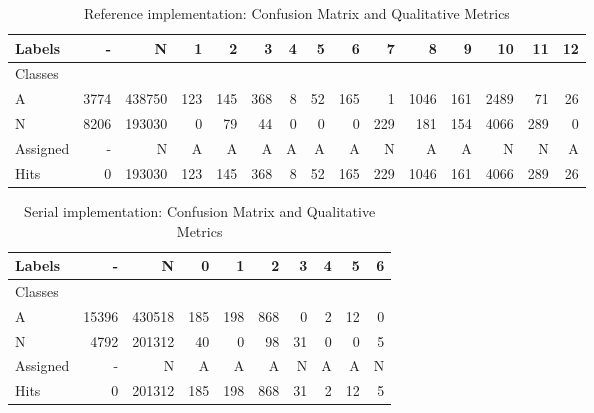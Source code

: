 \documentclass[conference]{IEEEtran}
\begin{document}
\begin{table}[htb]
  \begin{center}
    \caption{Reference implementation: Confusion Matrix and Qualitative Metrics}
    \begin{tabular}{l||r|r|r|r|r|r|r|r|r|r|r|r|r|r}
      
      Labels &     - &       N &    1 &    2 &    3 &  4 &   5 &    6 &    7 &     8 &    9 &    10 &   11 &  12 \\\hline
      Classes  &       &         &      &      &      &    &     &      &      &       &      &       &      &     \\\hline
      \hline
      A        &  3774 &  438750 &  123 &  145 &  368 &  8 &  52 &  165 &    1 &  1046 &  161 &  2489 &   71 &  26 \\\hline
      N        &  8206 &  193030 &    0 &   79 &   44 &  0 &   0 &    0 &  229 &   181 &  154 &  4066 &  289 &   0 \\\hline
      \hline
      Assigned &     - &       N &    A &    A &    A &  A &   A &    A &    N &     A &    A &     N &    N &   A \\\hline
      Hits     &     0 &  193030 &  123 &  145 &  368 &  8 &  52 &  165 &  229 &  1046 &  161 &  4066 &  289 &  26 
    \end{tabular}
    \label{tab:java-matrix}
  \end{center}
\end{table}
\begin{table}[htb]
  \begin{center}
    \caption{Serial implementation: Confusion Matrix and Qualitative Metrics}
    \begin{tabular}{l|r|r|r|r|r|r|r|r|r}
      Labels &      - &       N &    0 &    1 &    2 &   3 &  4 &   5 &  6 \\\hline
      Classes  &        &         &      &      &      &     &    &     &    \\\hline
      \hline
      A        &  15396 &  430518 &  185 &  198 &  868 &   0 &  2 &  12 &  0 \\\hline
      N        &   4792 &  201312 &   40 &    0 &   98 &  31 &  0 &   0 &  5 \\\hline
      \hline
      Assigned &      - &       N &    A &    A &    A &   N &  A &   A &  N \\\hline
      Hits     &      0 &  201312 &  185 &  198 &  868 &  31 &  2 &  12 &  5 
    \end{tabular}
    \label{tab:libc-matrix}
  \end{center}
\end{table}
\end{document}
